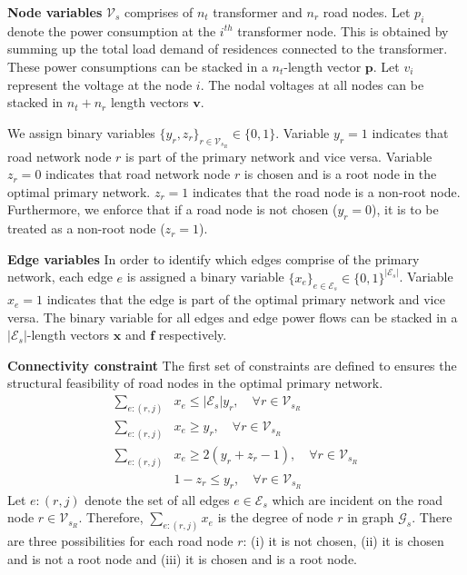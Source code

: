 \documentclass[sigconf]{acmart}
\begin{document}
\noindent\textbf{Node variables} $\mathcal{V}_s$ comprises of $n_t$ transformer and $n_r$ road nodes. Let $p_i$ denote the power consumption at the $i^{th}$ transformer node. This is obtained by summing up the total load demand of residences connected to the transformer. These power consumptions can be stacked in a $n_t$-length vector $\mathbf{p}$. Let $v_i$ represent the voltage at the node $i$. The nodal voltages at all nodes can be stacked in $n_t+n_r$ length vectors $\mathbf{v}$.

We assign binary variables $\{y_r,z_r\}_{r\in\mathcal{V}_{s_R}}\in\{0,1\}$. Variable $y_r=1$ indicates that road network node $r$ is part of the primary network and vice versa. Variable $z_r=0$ indicates that road network node $r$ is chosen and is a root node in the optimal primary network. $z_r=1$ indicates that the road node is a non-root node. Furthermore, we enforce that if a road node is not chosen ($y_r=0$), it is to be treated as a non-root node ($z_r=1$).

\noindent\textbf{Edge variables}
In order to identify which edges comprise of the primary network, each edge $e$ is assigned a binary variable $\{x_e\}_{e\in\mathcal{E}_s}\in\{0,1\}^{|\mathcal{E}_s|}$. Variable $x_e=1$ indicates that the edge is part of the optimal primary network and vice versa. The binary variable for all edges and edge power flows can be stacked in a $|\mathcal{E}_s|$-length vectors $\mathbf{x}$ and $\mathbf{f}$ respectively.

\noindent\textbf{Connectivity constraint}
The first set of constraints are defined to ensures the structural feasibility of road nodes in the optimal primary network.  
\begin{subequations}
	\begin{align}
	\sum_{e:(r,j)}&x_{e}\leq |\mathcal{E}_s|y_r,\quad \forall r\in\mathcal{V}_{s_R}\label{eq:non-chosen}\\
	\sum_{e:(r,j)}&x_{e}\geq y_r,\quad \forall r\in\mathcal{V}_{s_R}\label{eq:chosen}\\
	\sum_{e:(r,j)}&x_{e}\geq2(y_r+z_r-1),\quad \forall r\in\mathcal{V}_{s_R}\label{eq:transfer}\\
	&1-z_r\leq y_r\label{eq:non-root},\quad \forall r\in\mathcal{V}_{s_R}
	\end{align}
	\label{eq:prim-connectivity}
\end{subequations}
Let $e:(r,j)$ denote the set of all edges $e\in\mathcal{E}_s$ which are incident on the road node $r\in\mathcal{V}_{s_R}$. Therefore, $\sum_{e:(r,j)}x_{e}$ is the degree of node $r$ in graph $\mathcal{G}_s$. There are three possibilities for each road node $r$: (i) it is not chosen, (ii) it is chosen and is not a root node and (iii) it is chosen and is a root node. 
\end{document}
